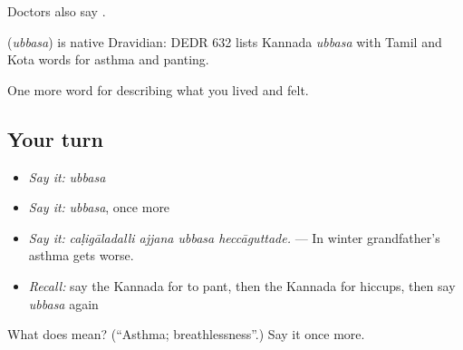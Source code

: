 Doctors also say .

\begin{cousinweb}
\textbf{} (\emph{ubbasa}) is native Dravidian: DEDR 632 lists Kannada \emph{ubbasa} with Tamil and Kota words for asthma and panting.
\end{cousinweb}

\begin{grammarlens}[title={What you've built}]
One more word for describing what you lived and felt.
\end{grammarlens}

\subsection*{Your turn}
\begin{itemize}
\raggedright
  \item \emph{Say it:} \emph{ubbasa}
  \item \emph{Say it:} \emph{ubbasa}, once more
  \item \emph{Say it:} \emph{caḷigāladalli ajjana ubbasa heccāguttade.} — In winter grandfather's asthma gets worse.
  \item \emph{Recall:} say the Kannada for to pant, then the Kannada for hiccups, then say \emph{ubbasa} again
\end{itemize}

\begin{tcolorbox}[breakable,colback=teal!4,colframe=teal!35!black,title={Before you move on}]
What does  mean? (\textquotedblleft{}Asthma; breathlessness\textquotedblright{}.) Say it once more.
\end{tcolorbox}

